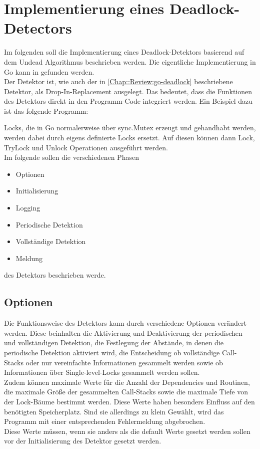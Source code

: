 \chapter{Implementierung eines Deadlock-Detectors}\label{Chap::Implementation}
Im folgenden soll die Implementierung eines Deadlock-Detektors basierend auf
dem Undead Algorithmus \cite{zhou} beschrieben werden. Die eigentliche 
Implementierung in Go kann in \cite{implementation} gefunden werden.\\
Der Detektor ist, wie auch der in \ref{Chap::Review:go-deadlock} beschriebene 
Detektor, als Drop-In-Replacement ausgelegt. Das bedeutet, dass die 
Funktionen des Detektors direkt in den Programm-Code integriert werden. Ein 
Beispiel dazu ist das folgende Programm:
\begin{figure}[H]
    
\end{figure}
Locks, die in Go normalerweise über sync.Mutex erzeugt und gehandhabt werden, 
werden dabei durch eigens definierte Locks ersetzt. Auf diesen können dann Lock, 
TryLock und Unlock Operationen ausgeführt werden.\\
Im folgende sollen die verschiedenen Phasen 
\begin{itemize}
    \item Optionen
    \item Initialisierung
    \item Logging
    \item Periodische Detektion
    \item Vollständige Detektion
    \item Meldung
\end{itemize}
des Detektors beschrieben werde. 


\section{Optionen} \label{Chap::Implementation:Options}
Die Funktionsweise des Detektors kann durch verschiedene Optionen 
verändert werden. Diese beinhalten die Aktivierung und Deaktivierung der 
periodischen und vollständigen Detektion, die Festlegung der Abstände, in denen 
die periodische Detektion aktiviert wird, die Entscheidung ob vollständige 
Call-Stacks oder nur vereinfachte Informationen gesammelt werden sowie 
ob Informationen über Single-level-Locks gesammelt werden sollen.\\
Zudem können maximale Werte für die Anzahl der Dependencies und Routinen, 
die maximale Größe der gesammelten Call-Stacks sowie die maximale Tiefe von 
der Lock-Bäume bestimmt werden. Diese Werte haben besonders Einfluss auf den 
benötigten Speicherplatz. Sind sie allerdings zu klein Gewählt, wird das 
Programm mit einer entsprechenden Fehlermeldung abgebrochen.\\
Diese Werte müssen, wenn sie anders als die default Werte gesetzt werden sollen 
vor der Initialisierung des Detektor gesetzt werden.

